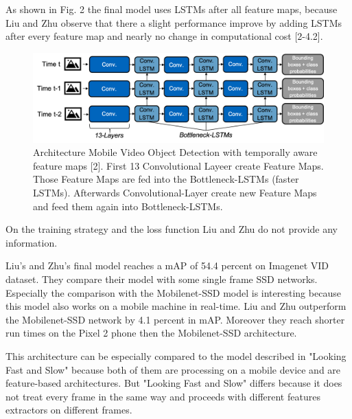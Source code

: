 \documentclass[conference]{IEEEtran}
\begin{document}
As shown in Fig. 2 the final model uses LSTMs after all feature maps, because Liu and Zhu observe that there a slight performance improve by adding LSTMs after every feature map and nearly no change in computational cost [2-4.2]. \newline

\begin{figure} [h]
\includegraphics[width=\columnwidth]{Liu_Zhu}
\caption{Architecture Mobile Video Object Detection with temporally aware feature maps [2]. First 13 Convolutional Layeer create Feature Maps. Those Feature Maps are fed into the Bottleneck-LSTMs (faster LSTMs). Afterwards Convolutional-Layer create new Feature Maps and feed them again into Bottleneck-LSTMs.}
\end{figure}

On the training strategy and the loss function Liu and Zhu do not provide any information. \newline

Liu's and Zhu's final model reaches a mAP of 54.4 percent on Imagenet VID dataset. They compare their model with some single frame SSD networks. Especially the comparison with the Mobilenet-SSD model is interesting because this model also works on a mobile machine in real-time. Liu and Zhu outperform the Mobilenet-SSD network by 4.1 percent in mAP. Moreover they reach shorter run times on the Pixel 2 phone then the Mobilenet-SSD architecture. \newline

This architecture can be especially compared to the model described in "Looking Fast and Slow" because both of them are processing on a mobile device and are feature-based architectures. But "Looking Fast and Slow" differs because it does not treat every frame in the same way and proceeds with different features extractors on different frames. 
\end{document}
